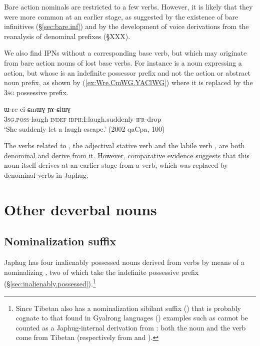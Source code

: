 Bare action nominals are restricted to a few verbs. However, it is likely that they were more common at an earlier stage, as suggested by the existence of bare infinitives (§\ref{sec:bare.inf}) and by the development of voice derivations from the reanalysis of denominal prefixes (§XXX).

We also find IPNs without a corresponding base verb, but which may originate from bare action nouns of lost base verbs. For instance  is a noun expressing a action, but whose  is an indefinite possessor prefix and not the action or abstract noun prefix, as shown by (\ref{ex:Wre.CmWG.YAClWG}) where it is replaced by the \textsc{3sg} possessive  prefix. 

\begin{exe}
\ex \label{ex:Wre.CmWG.YAClWG}
\gll  ɯ-re ci ɕmɯɣ ɲɤ-ɕlɯɣ \\
 \textsc{3sg}.\textsc{poss}-laugh \textsc{indef} \textsc{idph}:I:laugh.suddenly \textsc{ifr}-drop \\
\glt  `She suddenly let a laugh escape.' (2002 qaCpa, 100)
\end{exe}

The verbs related to  , the adjectival stative verb  and the labile verb , are both denominal and derive from it. However, comparative evidence suggests that this noun itself derives at an earlier stage from a verb, which was replaced by denominal verbs in Japhug.


\section{Other deverbal nouns}
\subsection{Nominalization  suffix} \label{sec:z.nmlz}
Japhug has four inalienably possessed nouns derived from verbs by means of a nominalizing , two of which take the indefinite possessive prefix  (§\ref{sec:inalienably.possessed}).\footnote{Since Tibetan also has a nominalization sibilant suffix  (\citealt{hill14derivational}) that is probably cognate to that found in Gyalrong languages (\citealt{jacques03s.houzhui}) examples such as  cannot be counted as a Japhug-internal derivation from : both the noun and the verb come from Tibetan (respectively from  and  ). }

